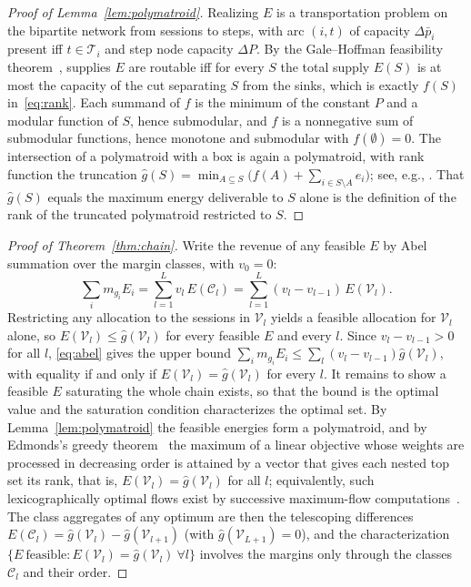\documentclass[manuscript, screen, review, anonymous]{acmart}
\begin{document}
\begin{proof}[Proof of Lemma~\ref{lem:polymatroid}]
Realizing $E$ is a transportation problem on the bipartite network from sessions to steps, with arc $(i,t)$ of capacity $\Delta\bar p_i$ present iff $t\in\mathcal{T}_i$ and step node capacity $\Delta P$. By the Gale--Hoffman feasibility theorem~\cite{gale1957theorem}, supplies $E$ are routable iff for every $S$ the total supply $E(S)$ is at most the capacity of the cut separating $S$ from the sinks, which is exactly $f(S)$ in~\eqref{eq:rank}. Each summand of $f$ is the minimum of the constant $P$ and a modular function of $S$, hence submodular, and $f$ is a nonnegative sum of submodular functions, hence monotone and submodular with $f(\emptyset)=0$. The intersection of a polymatroid with a box is again a polymatroid, with rank function the truncation $\hat g(S)=\min_{A\subseteq S}\big(f(A)+\sum_{i\in S\setminus A}e_i\big)$; see, e.g., \cite{fujishige2005submodular}. That $\hat g(S)$ equals the maximum energy deliverable to $S$ alone is the definition of the rank of the truncated polymatroid restricted to $S$.
\end{proof}

\begin{proof}[Proof of Theorem~\ref{thm:chain}]
Write the revenue of any feasible $E$ by Abel summation over the margin classes, with $v_0=0$:
\begin{equation}
\sum_i m_{g_i}E_i=\sum_{l=1}^{L}v_l\,E(\mathcal{C}_l)
=\sum_{l=1}^{L}(v_l-v_{l-1})\,E(\mathcal{V}_l).
\label{eq:abel}
\end{equation}
Restricting any allocation to the sessions in $\mathcal{V}_l$ yields a feasible allocation for $\mathcal{V}_l$ alone, so $E(\mathcal{V}_l)\le\hat g(\mathcal{V}_l)$ for every feasible $E$ and every $l$. Since $v_l-v_{l-1}>0$ for all $l$, \eqref{eq:abel} gives the upper bound $\sum_i m_{g_i}E_i\le\sum_l(v_l-v_{l-1})\hat g(\mathcal{V}_l)$, with equality if and only if $E(\mathcal{V}_l)=\hat g(\mathcal{V}_l)$ for every $l$. It remains to show a feasible $E$ saturating the whole chain exists, so that the bound is the optimal value and the saturation condition characterizes the optimal set. By Lemma~\ref{lem:polymatroid} the feasible energies form a polymatroid, and by Edmonds's greedy theorem~\cite{edmonds2003submodular} the maximum of a linear objective whose weights are processed in decreasing order is attained by a vector that gives each nested top set its rank, that is, $E(\mathcal{V}_l)=\hat g(\mathcal{V}_l)$ for all $l$; equivalently, such lexicographically optimal flows exist by successive maximum-flow computations~\cite{megiddo1974optimal}. The class aggregates of any optimum are then the telescoping differences $E(\mathcal{C}_l)=\hat g(\mathcal{V}_l)-\hat g(\mathcal{V}_{l+1})$ (with $\hat g(\mathcal{V}_{L+1})=0$), and the characterization $\{E\ \text{feasible}:E(\mathcal{V}_l)=\hat g(\mathcal{V}_l)\ \forall l\}$ involves the margins only through the classes $\mathcal{C}_l$ and their order.
\end{proof}
\end{document}
